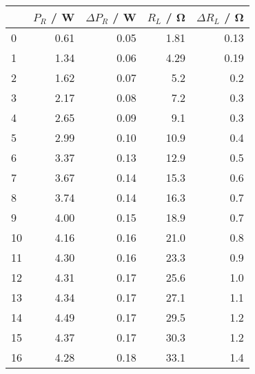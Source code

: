 \begin{tabular}{lrrrr}
	\toprule
	{} & $P_R$ / \si{\watt} & $\Delta P_R$ / \si{\watt} & $R_L$ / \si{\ohm} & $\Delta R_L$ / \si{\ohm} \\
	\midrule
	0  & 0.61               & 0.05                      & 1.81              & 0.13                     \\
	1  & 1.34               & 0.06                      & 4.29              & 0.19                     \\
	2  & 1.62               & 0.07                      & 5.2               & 0.2                      \\
	3  & 2.17               & 0.08                      & 7.2               & 0.3                      \\
	4  & 2.65               & 0.09                      & 9.1               & 0.3                      \\
	5  & 2.99               & 0.10                      & 10.9              & 0.4                      \\
	6  & 3.37               & 0.13                      & 12.9              & 0.5                      \\
	7  & 3.67               & 0.14                      & 15.3              & 0.6                      \\
	8  & 3.74               & 0.14                      & 16.3              & 0.7                      \\
	9  & 4.00               & 0.15                      & 18.9              & 0.7                      \\
	10 & 4.16               & 0.16                      & 21.0              & 0.8                      \\
	11 & 4.30               & 0.16                      & 23.3              & 0.9                      \\
	12 & 4.31               & 0.17                      & 25.6              & 1.0                      \\
	13 & 4.34               & 0.17                      & 27.1              & 1.1                      \\
	14 & 4.49               & 0.17                      & 29.5              & 1.2                      \\
	15 & 4.37               & 0.17                      & 30.3              & 1.2                      \\
	16 & 4.28               & 0.18                      & 33.1              & 1.4                      \\

\end{tabular}
